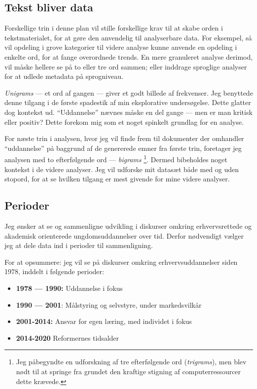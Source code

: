 \subsection{Tekst bliver data}

Forskellige trin i denne plan vil stille forskellige krav til at skabe orden i tekstmaterialet, for at gøre den anvendelig til analyserbare data.
For eksempel, så vil opdeling i grove kategorier til videre analyse kunne anvende en opdeling i enkelte ord, for at fange overordnede trends.
En mere granuleret analyse derimod, vil måske hellere se på to eller tre ord sammen; eller inddrage sproglige analyser for at udlede metadata på sprogniveau.

\textit{Unigrams} — et ord af gangen — giver et godt billede af frekvenser.
Jeg benyttede  denne tilgang i de første spadestik af min eksplorative undersøgelse.
Dette glatter dog kontekst ud.
“Uddannelse” nævnes måske en del gange — men er man kritisk eller positiv?
Dette forekom mig som et noget spinkelt grundlag for en analyse.

For næste trin i analysen, hvor jeg vil finde frem til dokumenter der omhandler “uddannelse” på baggrund af de genererede emner fra første trin, foretager jeg analysen med to efterfølgende ord — \textit{bigrams} \footnote{Jeg påbegyndte en udforskning af tre efterfølgende ord (\textit{trigrams}), men blev nødt til at springe fra grundet den kraftige stigning af computerressourcer dette krævede.}.
Dermed bibeholdes noget kontekst i de videre analyser.
Jeg vil udforske mit datasæt både med og uden stopord, for at se hvilken tilgang er mest givende for mine videre analyser.

\subsection{Perioder}\label{sec:periods}
Jeg ønsker at se og sammenligne udvikling i diskurser omkring erhvervsrettede og akademisk orienterede ungdomsuddannelser over tid.
Derfor nødvendigt vælger jeg at dele data ind i perioder til sammenligning.

For at opsummere: jeg vil se på diskurser omkring erhvervsuddannelser siden 1978, inddelt i følgende perioder:

\begin{itemize}
  \item
    \textbf{1978 — 1990:} Uddannelse i fokus
  \item
    \textbf{1990 — 2001}: Målstyring og selvstyre, under markedsvilkår
  \item
    \textbf{2001-2014:} Ansvar for egen læring, med individet i fokus
  \item
    \textbf{2014-2020} Reformernes tidsalder
\end{itemize}

